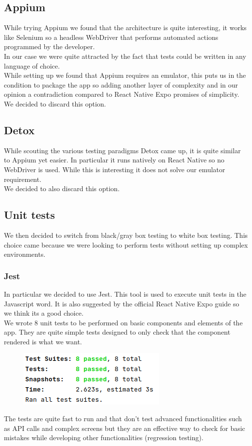 \documentclass[10pt]{article}
\begin{document}
    \subsection{Appium}
    While trying Appium we found that the architecture is quite interesting, it works like Selenium so a headless WebDriver that performs automated actions programmed by the developer. \\
    In our case we were quite attracted by the fact that tests could be written in any language of choice. \\
    While setting up we found that Appium requires an emulator, this puts us in the condition to package the app so adding another layer of complexity and in our opinion a contradiction compared to React Native Expo promises of simplicity. \\
    We decided to discard this option.
    \subsection{Detox}
    While scouting the various testing paradigms Detox came up, it is quite similar to Appium yet easier. In particular it runs natively on React Native so no WebDriver is used. While this is interesting it does not solve our emulator requirement. \\
    We decided to also discard this option.
    \subsection{Unit tests}
    We then decided to switch from black/gray box testing to white box testing. This choice came because we were looking to perform tests without setting up complex environments.
    \subsubsection{Jest}
    In particular we decided to use Jest. This tool is used to execute unit tests in the Javascript word. It is also suggested by the official React Native Expo guide so we think its a good choice.\\
    We wrote 8 unit tests to be performed on basic components and elements of the app. They are quite simple tests designed to only check that the component rendered is what we want.
    \begin{figure}[H]
    	\includegraphics[scale=0.6]{resources/unittest.png}
    \end{figure}
    The tests are quite fast to run and that don't test advanced functionalities such as API calls and complex screens but they are an effective way to check for basic mistakes while developing other functionalities (regression testing).
\end{document}
